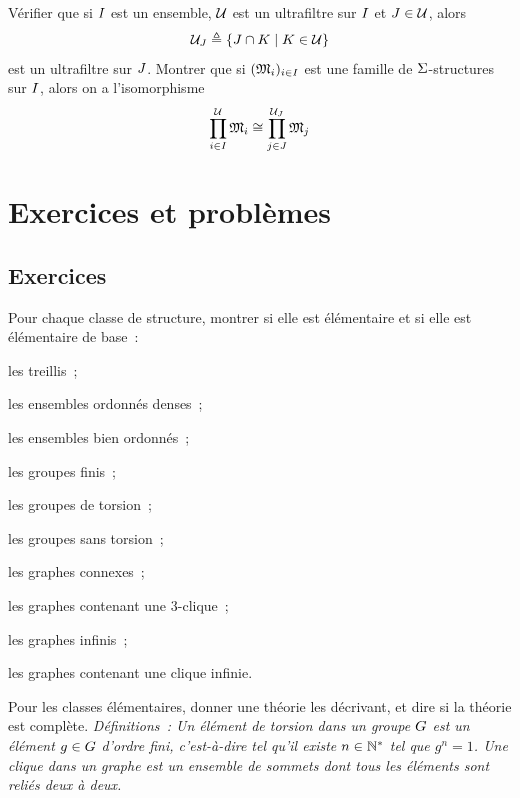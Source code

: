 \begin{exercise}
  Vérifier que si $I$ est un ensemble, $\mathcal{U}$ est un ultrafiltre
  sur $I$ et $J \in \mathcal{U}$, alors
  \[\mathcal{U}_{J} \triangleq \left\{ J\cap K \;\middle\vert\; K\in\mathcal{U} \right\}\]
  est un ultrafiltre sur $J$. Montrer que si $(\mathfrak{M}_i)_{i \in I}$
  est une famille de $\Sigma$-structures sur $I$, alors on a l'isomorphisme
  \[\prod_{i \in I}^{\mathcal{U}}\mathfrak{M}_i \cong
  \prod_{j \in J}^{\mathcal{U}_{J}} \mathfrak{M}_j\]
\end{exercise}

\clearpage

\section{Exercices et problèmes}

\subsection{Exercices}

\begin{exercise}
  Pour chaque classe de structure, montrer si elle est élémentaire et si elle
  est élémentaire de base~:

  \vspace{5pt}
  \begin{enumerate}[label=(\roman*)]
    \begin{minipage}{0.45\textwidth}
    \item les treillis~;
    \item les ensembles ordonnés denses~;
    \item les ensembles bien ordonnés~;
    \item les groupes finis~;
    \item les groupes de torsion~;
    \end{minipage}
    \begin{minipage}{0.45\textwidth}
    \item les groupes sans torsion~;
    \item les graphes connexes~;
    \item les graphes contenant une $3$-clique~;
    \item les graphes infinis~;
    \item les graphes contenant une clique infinie.
    \end{minipage}
  \end{enumerate}
  Pour les classes élémentaires, donner une théorie les décrivant, et dire si
  la théorie est complète.
  \textit{Définitions~: Un élément de torsion dans un groupe $G$ est un
    élément $g \in G$ d'ordre fini, c'est-à-dire tel qu'il existe
    $n \in\mathbb N^*$ tel que $g^n = 1$. Une clique dans un graphe est un ensemble
    de sommets dont tous les éléments sont reliés deux à deux.}
\end{exercise}

